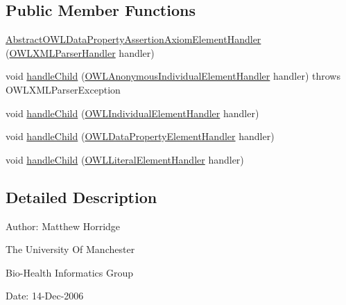 \subsection*{Public Member Functions}
\begin{DoxyCompactItemize}
\item 
\hyperlink{classorg_1_1coode_1_1owlapi_1_1owlxmlparser_1_1_abstract_o_w_l_data_property_assertion_axiom_element_handler_a3f8eec680acd8bd2dc423f3c7aba9040}{Abstract\-O\-W\-L\-Data\-Property\-Assertion\-Axiom\-Element\-Handler} (\hyperlink{classorg_1_1coode_1_1owlapi_1_1owlxmlparser_1_1_o_w_l_x_m_l_parser_handler}{O\-W\-L\-X\-M\-L\-Parser\-Handler} handler)
\item 
void \hyperlink{classorg_1_1coode_1_1owlapi_1_1owlxmlparser_1_1_abstract_o_w_l_data_property_assertion_axiom_element_handler_ac7a2dd4ae1fe5570fb52af6ded7463df}{handle\-Child} (\hyperlink{classorg_1_1coode_1_1owlapi_1_1owlxmlparser_1_1_o_w_l_anonymous_individual_element_handler}{O\-W\-L\-Anonymous\-Individual\-Element\-Handler} handler)  throws O\-W\-L\-X\-M\-L\-Parser\-Exception 
\item 
void \hyperlink{classorg_1_1coode_1_1owlapi_1_1owlxmlparser_1_1_abstract_o_w_l_data_property_assertion_axiom_element_handler_aa74da08b840aec67716111a72aa974b9}{handle\-Child} (\hyperlink{classorg_1_1coode_1_1owlapi_1_1owlxmlparser_1_1_o_w_l_individual_element_handler}{O\-W\-L\-Individual\-Element\-Handler} handler)
\item 
void \hyperlink{classorg_1_1coode_1_1owlapi_1_1owlxmlparser_1_1_abstract_o_w_l_data_property_assertion_axiom_element_handler_a386e5c41e9217616286802aecf14bce6}{handle\-Child} (\hyperlink{classorg_1_1coode_1_1owlapi_1_1owlxmlparser_1_1_o_w_l_data_property_element_handler}{O\-W\-L\-Data\-Property\-Element\-Handler} handler)
\item 
void \hyperlink{classorg_1_1coode_1_1owlapi_1_1owlxmlparser_1_1_abstract_o_w_l_data_property_assertion_axiom_element_handler_a436c187698cade0fe6b6202a264a2993}{handle\-Child} (\hyperlink{classorg_1_1coode_1_1owlapi_1_1owlxmlparser_1_1_o_w_l_literal_element_handler}{O\-W\-L\-Literal\-Element\-Handler} handler)
\end{DoxyCompactItemize}


\subsection{Detailed Description}
Author\-: Matthew Horridge\par
 The University Of Manchester\par
 Bio-\/\-Health Informatics Group\par
 Date\-: 14-\/\-Dec-\/2006\par
\par
 

